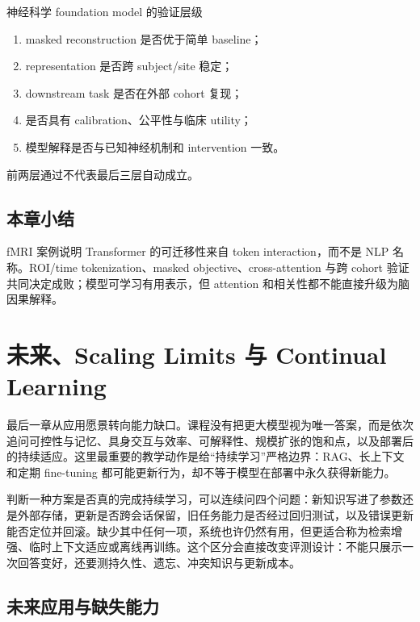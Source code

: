 \documentclass[a4paper]{article}
\begin{document}

\begin{knowledgebox}{神经科学 foundation model 的验证层级}
\begin{enumerate}
  \item masked reconstruction 是否优于简单 baseline；
  \item representation 是否跨 subject/site 稳定；
  \item downstream task 是否在外部 cohort 复现；
  \item 是否具有 calibration、公平性与临床 utility；
  \item 模型解释是否与已知神经机制和 intervention 一致。
\end{enumerate}
前两层通过不代表最后三层自动成立。
\end{knowledgebox}

\subsection{本章小结}

fMRI 案例说明 Transformer 的可迁移性来自 token interaction，而不是 NLP 名称。ROI/time tokenization、masked objective、cross-attention 与跨 cohort 验证共同决定成败；模型可学习有用表示，但 attention 和相关性都不能直接升级为脑因果解释。

\section{未来、Scaling Limits 与 Continual Learning}

最后一章从应用愿景转向能力缺口。课程没有把更大模型视为唯一答案，而是依次追问可控性与记忆、具身交互与效率、可解释性、规模扩张的饱和点，以及部署后的持续适应。这里最重要的教学动作是给“持续学习”严格边界：RAG、长上下文和定期 fine-tuning 都可能更新行为，却不等于模型在部署中永久获得新能力。

判断一种方案是否真的完成持续学习，可以连续问四个问题：新知识写进了参数还是外部存储，更新是否跨会话保留，旧任务能力是否经过回归测试，以及错误更新能否定位并回滚。缺少其中任何一项，系统也许仍然有用，但更适合称为检索增强、临时上下文适应或离线再训练。这个区分会直接改变评测设计：不能只展示一次回答变好，还要测持久性、遗忘、冲突知识与更新成本。

\subsection{未来应用与缺失能力}
\end{document}
